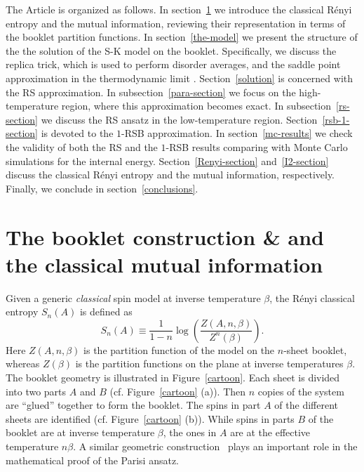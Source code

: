 \documentclass[twocolumn,superscriptaddress,prb,10pt]{revtex4-1}
\begin{document}
The Article is organized as follows. In section~\ref{booklet} we introduce the classical 
R\'enyi entropy and the mutual information, reviewing their representation in terms of 
the booklet partition functions. In section~\ref{the-model} we present the structure of 
the  the solution of the S-K model on the booklet. Specifically, we discuss the replica 
trick, which is used to perform disorder averages, and the saddle point approximation in 
the thermodynamic limit . Section~\ref{solution} is concerned with the RS approximation. 
In subsection~\ref{para-section} we focus on the high-temperature 
region, where this approximation becomes exact. In subsection~\ref{rs-section} we discuss 
the RS ansatz in the low-temperature region. Section~\ref{rsb-1-section} is devoted to   
the $1$-RSB approximation. In section~\ref{mc-results} we check the validity of both 
the RS and the $1$-RSB results comparing with Monte Carlo simulations for the internal energy. 
Section~\ref{Renyi-section} and~\ref{I2-section} discuss the classical R\'enyi entropy and the 
mutual information, respectively. Finally, we conclude in section~\ref{conclusions}.



\section{The booklet construction \& and the classical mutual information}
\label{booklet}


Given a generic \emph{classical} spin model at inverse temperature $\beta$, 
the R\'enyi classical entropy $S_n(A)$ is defined as~\cite{jaconis-2013,stephan-2014} 
%
\begin{equation}
\label{renyi}
S_n(A)\equiv \frac{1}{1-n}\log\left(\frac{Z(A,n,\beta)}{Z^n(\beta)}\right).
\end{equation}
%
Here $Z(A,n,\beta)$ is the partition function of the model on the $n$-sheet booklet, 
whereas $Z(\beta)$ is the partition functions on the plane at inverse temperatures $\beta$. 
The booklet geometry is illustrated in Figure~\ref{cartoon}. 
Each sheet is divided into two parts $A$ and $B$ (cf. Figure~\ref{cartoon} (a)). Then $n$ copies 
of the system are ``glued'' together to form the booklet. The spins in part $A$ of the different 
sheets are identified (cf. Figure~\ref{cartoon} (b)). While spins in parts $B$ of the booklet 
are at inverse temperature $\beta$, the ones in $A$ are at the effective temperature $n\beta$. 
A similar geometric construction~\cite{guerra-2002} plays an important role in the mathematical 
proof of the Parisi ansatz. 
\end{document}
